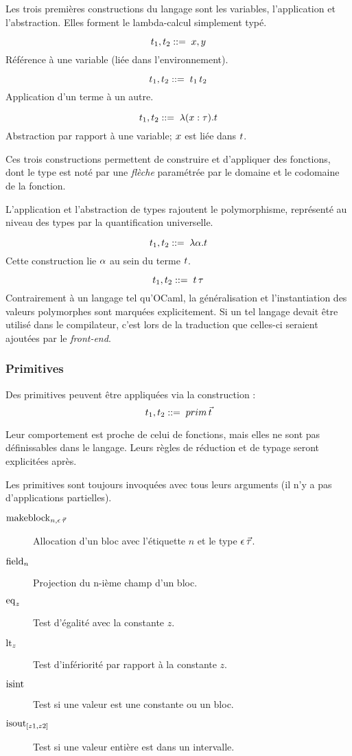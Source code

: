 Les trois premières constructions du langage sont les variables, l'application
et l'abstraction. Elles forment le lambda-calcul simplement typé.

$$t_1, t_2 ::= \; x, y$$
%
Référence à une variable (liée dans l'environnement).

$$t_1, t_2 ::= \;   t_1 \, t_2$$
%
Application d'un terme à un autre.

$$t_1, t_2 ::= \;   \lambda (x : \tau) . t$$
%
Abstraction par rapport à une variable; $x$ est liée dans $t$.

Ces trois constructions permettent de construire et d'appliquer des fonctions,
dont le type est noté par une \emph{flèche} paramétrée par le domaine et le
codomaine de la fonction.

L'application et l'abstraction de types rajoutent le polymorphisme, représenté
au niveau des types par la quantification universelle.

$$t_1, t_2 ::= \;   \lambda \alpha . t$$
%
Cette construction lie $\alpha$ au sein du terme $t$.

$$t_1, t_2 ::= \;   t \, \tau $$
%
Contrairement à un langage tel qu'OCaml, la généralisation et l'instantiation
des valeurs polymorphes sont marquées explicitement. Si un tel langage devait
être utilisé dans le compilateur, c'est lors de la traduction que celles-ci
seraient ajoutées par le \emph{front-end}.

\subsubsection{Primitives}

Des primitives peuvent être appliquées via la construction :
%
$$t_1, t_2 ::= \; prim \, \vec{t}$$

Leur comportement est proche de celui de fonctions, mais elles ne sont pas
définissables dans le langage. Leurs règles de réduction et de typage seront
explicitées après.

Les primitives sont toujours invoquées avec tous leurs arguments (il n'y a pas
d'applications partielles).

\begin{description}
  \item[$\operatorname{makeblock}_{n,\epsilon \, \vec{\tau}}$] Allocation d'un bloc avec l'étiquette $n$
    et le type $\epsilon \, \vec{\tau}$.
  \item[$\operatorname{field}_n$] Projection du n-ième champ d'un bloc.
  \item[$\operatorname{eq}_z$] Test d'égalité avec la constante $z$.
  \item[$\operatorname{lt}_z$] Test d'infériorité par rapport à la constante $z$.
  \item[$\operatorname{isint}$] Test si une valeur est une constante ou un bloc.
  \item[$\operatorname{isout}_{[z1,z2]}$] Test si une valeur entière est dans un
    intervalle.
\end{description}

